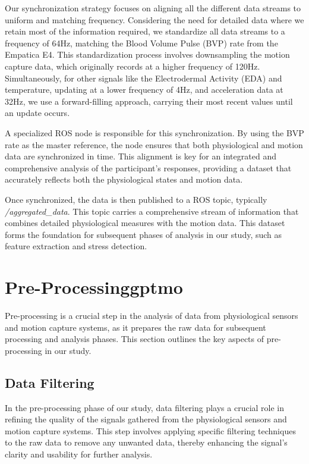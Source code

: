 Our synchronization strategy focuses on aligning all the different data streams to uniform and matching frequency. Considering the need for detailed data where we retain most of the information required, we standardize all data streams to a frequency of 64Hz, matching the Blood Volume Pulse (BVP) rate from the Empatica E4. This standardization process involves downsampling the motion capture data, which originally records at a higher frequency of 120Hz. Simultaneously, for other signals like the Electrodermal Activity (EDA) and temperature, updating at a lower frequency of 4Hz, and acceleration data at 32Hz, we use a forward-filling approach, carrying their most recent values until an update occurs.

A specialized ROS node is responsible for this synchronization.  By using the BVP rate as the master reference, the node ensures that both physiological and motion data are synchronized in time. This alignment is key for an integrated and comprehensive analysis of the participant's responses, providing a dataset that accurately reflects both the physiological states and motion data.

Once synchronized, the data is then published to a ROS topic, typically \textit{/aggregated\_data}. This topic carries a comprehensive stream of information that combines detailed physiological measures with the motion data. This dataset forms the foundation for subsequent phases of analysis in our study, such as feature extraction and stress detection.

\section{Pre-Processing\gls*{gptmo}} 
Pre-processing is a crucial step in the analysis of data from physiological sensors and motion capture systems, as it prepares the raw data for subsequent processing and analysis phases. This section outlines the key aspects of pre-processing in our study.

\subsection*{Data Filtering} \label{sec:data_filtering}

In the pre-processing phase of our study, data filtering plays a crucial role in refining the quality of the signals gathered from the physiological sensors and motion capture systems. This step involves applying specific filtering techniques to the raw data to remove any unwanted data, thereby enhancing the signal's clarity and usability for further analysis.

